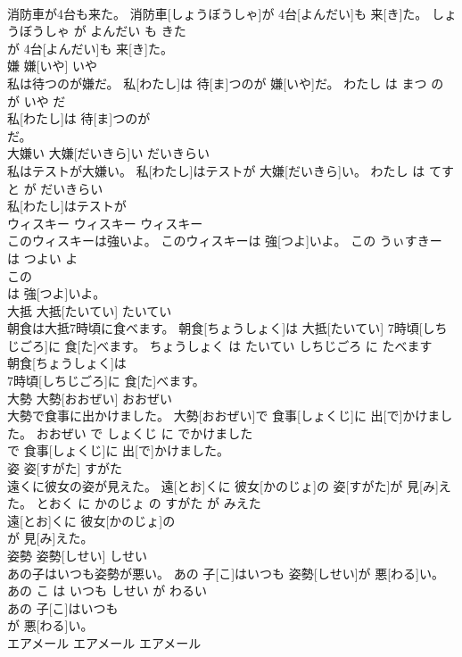 \documentclass[8pt]{extreport}
\begin{document}
\begin{CJK}{UTF8}{min}
\\	消防車が4台も来た。	消防車[しょうぼうしゃ]が 4台[よんだい]も 来[き]た。	しょうぼうしゃ が よんだい も きた	
\\	が 4台[よんだい]も 来[き]た。		
\\	嫌	嫌[いや]	いや	
\\	私は待つのが嫌だ。	私[わたし]は 待[ま]つのが 嫌[いや]だ。	わたし は まつ の が いや だ	
\\	私[わたし]は 待[ま]つのが
\\	だ。		
\\	大嫌い	大嫌[だいきら]い	だいきらい	
\\	私はテストが大嫌い。	私[わたし]はテストが 大嫌[だいきら]い。	わたし は てすと が だいきらい	
\\	私[わたし]はテストが
\\	ウィスキー	ウィスキー	ウィスキー	
\\	このウィスキーは強いよ。	このウィスキーは 強[つよ]いよ。	この うぃすきー は つよい よ	
\\	この
\\	は 強[つよ]いよ。		
\\	大抵	大抵[たいてい]	たいてい	
\\	朝食は大抵7時頃に食べます。	朝食[ちょうしょく]は 大抵[たいてい] 7時頃[しちじごろ]に 食[た]べます。	ちょうしょく は たいてい しちじごろ に たべます	
\\	朝食[ちょうしょく]は
\\	7時頃[しちじごろ]に 食[た]べます。		
\\	大勢	大勢[おおぜい]	おおぜい	
\\	大勢で食事に出かけました。	大勢[おおぜい]で 食事[しょくじ]に 出[で]かけました。	おおぜい で しょくじ に でかけました	
\\	で 食事[しょくじ]に 出[で]かけました。		
\\	姿	姿[すがた]	すがた	
\\	遠くに彼女の姿が見えた。	遠[とお]くに 彼女[かのじょ]の 姿[すがた]が 見[み]えた。	とおく に かのじょ の すがた が みえた	
\\	遠[とお]くに 彼女[かのじょ]の
\\	が 見[み]えた。		
\\	姿勢	姿勢[しせい]	しせい	
\\	あの子はいつも姿勢が悪い。	あの 子[こ]はいつも 姿勢[しせい]が 悪[わる]い。	あの こ は いつも しせい が わるい	
\\	あの 子[こ]はいつも
\\	が 悪[わる]い。		
\\	エアメール	エアメール	エアメール	

\end{CJK}
\end{document}
